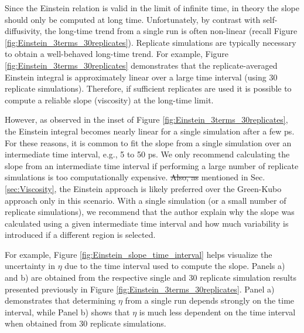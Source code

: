 \documentclass[9pt,bestpractices]{livecoms}
\providecommand{\DIFadd}[1]{{\protect\color{blue}\uwave{#1}}} %
\providecommand{\DIFdel}[1]{{\protect\color{red}\sout{#1}}}                      %
\providecommand{\DIFaddbegin}{} %
\providecommand{\DIFaddend}{} %
\providecommand{\DIFdelbegin}{} %
\providecommand{\DIFdelend}{} %
\begin{document}
Since the Einstein relation is valid in the limit of infinite time, in theory the slope should only be computed at long time. Unfortunately, by contrast with self-diffusivity, the long-time trend from a single run is often non-linear (recall Figure \ref{fig:Einstein_3terms_30replicates}). Replicate simulations are typically necessary to obtain a well-behaved long-time trend. For example, Figure \ref{fig:Einstein_3terms_30replicates} demonstrates that the replicate-averaged Einstein integral is approximately linear over a large time interval (using 30 replicate simulations). Therefore, if sufficient replicates are used it is possible to compute a reliable slope (viscosity) at the long-time limit.

However, as observed in the inset of Figure \ref{fig:Einstein_3terms_30replicates}, the Einstein integral becomes nearly linear for a single simulation after a few ps. For these reasons, it is common to fit the slope from a single simulation over an intermediate time interval, e.g., 5 to 50 ps. We only recommend calculating the slope from an intermediate time interval if performing a large number of replicate simulations is too computationally expensive. \DIFdelbegin \DIFdel{Also, as }\DIFdelend \DIFaddbegin \DIFadd{As }\DIFaddend mentioned in Sec.\DIFaddbegin \DIFadd{\ }\DIFaddend \ref{sec:Viscosity}, the Einstein approach is likely preferred over the Green-Kubo approach only in this scenario. With a single simulation (or a small number of replicate simulations), we recommend that the author explain why the slope was calculated using a given intermediate time interval and how much variability is introduced if a different region is selected. 

For example, Figure \ref{fig:Einstein_slope_time_interval} helps visualize the uncertainty in $\eta$ due to the time interval used to compute the slope. Panels a) and b) are obtained from the respective single and 30 replicate simulation results presented previously in Figure \ref{fig:Einstein_3terms_30replicates}. Panel a) demonstrates that determining $\eta$ from a single run depends strongly on the time interval, while Panel b) shows that $\eta$ is much less dependent on the time interval when obtained from 30 replicate simulations.
\end{document}
